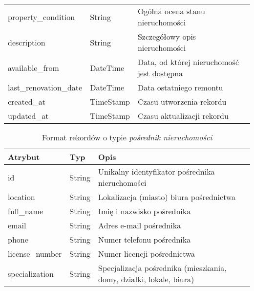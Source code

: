 \begin{table}[H]
\begin{tabular}{|l|l|l|}
    property\_condition & String & Ogólna ocena stanu nieruchomości \\
    description & String & Szczegółowy opis nieruchomości \\
    available\_from & DateTime & Data, od której nieruchomość jest dostępna \\
    last\_renovation\_date & DateTime & Data ostatniego remontu \\
    created\_at & TimeStamp & Czasu utworzenia rekordu \\
    updated\_at & TimeStamp & Czasu aktualizacji rekordu \\
    \hline
    \end{tabular}
    \label{tab:property_details}
\end{table}

\begin{table}[H]
    \caption{Format rekordów o typie \textit{pośrednik nieruchomości}}
    \centering
    \begin{tabular}{|l|l|l|}
    \hline
    \textbf{Atrybut} & \textbf{Typ} & \textbf{Opis} \\
    \hline
    id & String & Unikalny identyfikator pośrednika nieruchomości \\
    location & String & Lokalizacja (miasto) biura pośrednictwa \\
    full\_name & String & Imię i nazwisko pośrednika \\
    email & String & Adres e-mail pośrednika \\
    phone & String & Numer telefonu pośrednika \\
    license\_number & String & Numer licencji pośrednictwa \\
    specialization & String & Specjalizacja pośrednika (mieszkania, domy, działki, lokale, biura) \\ 
    \hline
    \end{tabular}
    \label{tab:agent_details}
\end{table}

